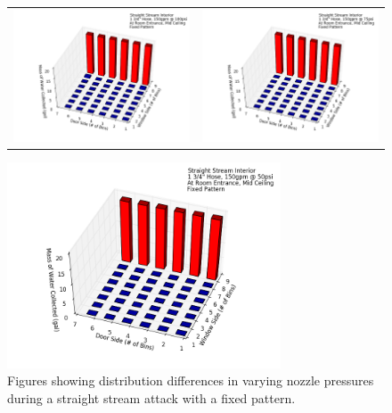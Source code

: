 \documentclass{article}
\begin{document}
\begin{figure}[ht]
\begin{tabular*}{\textwidth}{lr}
\includegraphics[width=3.2in]{../ADD_Analysis/Figures/15-12-09_112850_Datafile_Straight_Stream_Interior.png} &
\includegraphics[width=3.2in]{../ADD_Analysis/Figures/15-12-09_115707_Datafile_Straight_Stream_Interior.png} \\
\end{tabular*}
\centering
\includegraphics[width=3.2in]{../ADD_Analysis/Figures/15-12-09_121955_Datafile_Straight_Stream_Interior.png}
\caption{Figures showing distribution differences in varying nozzle pressures during a straight stream attack with a fixed pattern.}
\label{fig:Interior_Varying_Nozzle_Pressure_SS_Fixed_Pattern}
\end{figure}
\end{document}

